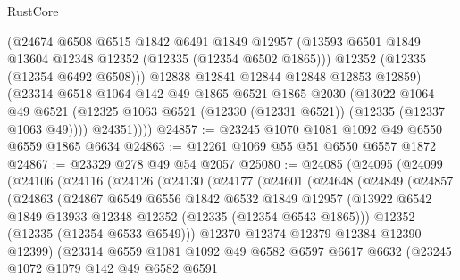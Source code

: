 \begin{lexlean}{RustCore}
\begin{coremodule}
            (@24674
              @6508
              @6515
              @1842
              @6491
              @1849
              @12957
              (@13593 @6501 @1849 @13604 @12348 @12352 (@12335 (@12354 @6502 @1865)))
              @12352
              (@12335 (@12354 @6492 @6508)))
            @12838
            @12841
            @12844
            @12848
            @12853
            @12859)
          (@23314
            @6518
            @1064
            @142
            @49
            @1865
            @6521
            @1865
            @2030
            (@13022
              @1064
              @49
              @6521
              (@12325 @1063 @6521 (@12330 (@12331 @6521)) (@12335 (@12337 @1063 @49))))
            @24351))))
@24857 := @23245 @1070 @1081 @1092 @49 @6550 @6559 @1865 @6634
@24863 := @12261 @1069 @55 @51 @6550 @6557 @1872
@24867 := @23329 @278 @49 @54 @2057
@25080 := @24085
    (@24095
      (@24099
        (@24106
          (@24116
            (@24126
              (@24130
                (@24177
                  (@24601
                    (@24648
                      (@24849
                        (@24857
                          (@24863
                            (@24867
                              @6549
                              @6556
                              @1842
                              @6532
                              @1849
                              @12957
                              (@13922
                                @6542
                                @1849
                                @13933
                                @12348
                                @12352
                                (@12335 (@12354 @6543 @1865)))
                              @12352
                              (@12335 (@12354 @6533 @6549)))
                            @12370
                            @12374
                            @12379
                            @12384
                            @12390
                            @12399)
                          (@23314
                            @6559
                            @1081
                            @1092
                            @49
                            @6582
                            @6597
                            @6617
                            @6632
                            (@23245
                              @1072
                              @1079
                              @142
                              @49
                              @6582
                              @6591

\end{coremodule}
\end{lexlean}
